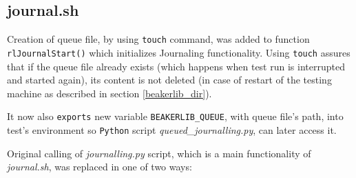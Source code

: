 \subsection{journal.sh}
Creation of  queue file, by using \texttt{touch} command, was added to function \texttt{rlJournalStart()} which initializes Journaling functionality. Using \texttt{touch} assures that if the queue file already exists (which happens when test run is interrupted and started again), its content is not deleted (in case of restart of the testing machine as described in section \ref{beakerlib_dir}).

It now also \texttt{exports} new variable \texttt{BEAKERLIB\_QUEUE}, with queue file's path, into test's environment so \texttt{Python} script \textit{queued\_journalling.py}, can later access it.

Original calling of \textit{journalling.py} script, which is a main functionality of \textit{journal.sh}, was replaced in one of two ways:

